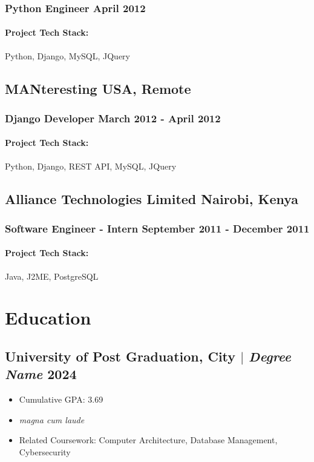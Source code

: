 \documentclass[11pt]{article} %
\begin{document}
\subsubsection{Python Engineer \hfill  April 2012}
\begin{itemize}
    \paragraph{Project Tech Stack:} Python, Django, MySQL, JQuery
\end{itemize}

\subsection{MANteresting \hfill USA, Remote}
\subsubsection{Django Developer \hfill  March 2012 - April 2012}
\begin{itemize}
    \paragraph{Project Tech Stack:} Python, Django, REST API, MySQL, JQuery
\end{itemize}

\subsection{Alliance Technologies Limited \hfill Nairobi, Kenya}
\subsubsection{Software Engineer - Intern \hfill  September 2011 - December 2011}
\begin{itemize}
    \paragraph{Project Tech Stack:} Java, J2ME, PostgreSQL
\end{itemize}

\section{Education}
\subsection{University of Post Graduation, City $|$ {\normalfont\itshape Degree Name} \hfill 2024}
\begin{itemize}
        \item Cumulative GPA: 3.69
        \item \textit{magna cum laude} 
  \item Related Coursework: Computer Architecture, Database Management, Cybersecurity
\end{itemize}
\end{document}
